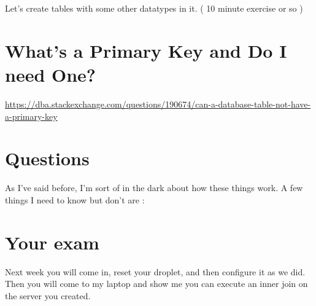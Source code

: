 \documentclass[12pt]{article}
\begin{document}
Let's create tables with some other datatypes in it. ( 10 minute exercise or so )

\section{ What's a Primary Key and Do I need One?}
\url{https://dba.stackexchange.com/questions/190674/can-a-database-table-not-have-a-primary-key}

\section{ Questions }
As I've said before, I'm sort of in the dark about how these things work. A few things I need to know but don't are :


\section{Your exam}
Next week you will come in, reset your droplet, and then configure it as we did. Then you will come to my laptop and show me you can execute an inner join on the server you created.
\end{document}

